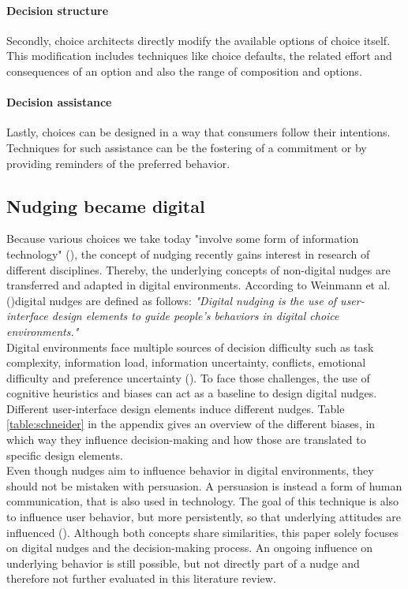 \paragraph{Decision structure}
Secondly, choice architects directly modify the available options of choice itself. This modification includes techniques like choice defaults, the related effort and consequences of an option and also the range of composition and options.
\paragraph{Decision assistance}
Lastly, choices can be designed in a way that consumers follow their intentions. Techniques for such assistance can be the fostering of a commitment or by providing reminders of the preferred behavior.

\subsection{Nudging became digital}
Because various choices we take today "involve some form of information technology" (\cite[p.490]{johnson_beyond_2012}), the concept of nudging recently gains interest in research of different disciplines. Thereby, the underlying concepts of non-digital nudges are transferred and adapted in digital environments. According to Weinmann et al.  (\citeyear[p.433]{weinmann_digital_2016})digital nudges are defined as follows:
\textit{"Digital nudging is the use of user-interface design elements to guide people's behaviors in digital choice environments."}
\\

Digital environments face multiple sources of decision difficulty such as task complexity, information load, information uncertainty, conflicts, emotional difficulty and preference uncertainty (\cite{broniarczyk_decision_2014}). To face those challenges, the use of cognitive heuristics and biases can act as a baseline to design digital nudges. Different user-interface design elements induce different nudges. Table \ref{table:schneider} in the appendix gives an overview of the different biases, in which way they influence decision-making and how those are translated to specific design elements.
\\

Even though nudges aim to influence behavior in digital environments, they should not be mistaken with persuasion. A persuasion is instead a form of human communication, that is also used in technology. The goal of this technique is also to influence user behavior, but more persistently, so that underlying attitudes are influenced (\cite{oinas-kukkonen_persuasive_2009}). Although both concepts share similarities, this paper solely focuses on digital nudges and the decision-making process. An ongoing influence on underlying behavior is still possible, but not directly part of a nudge and therefore not further evaluated in this literature review.


